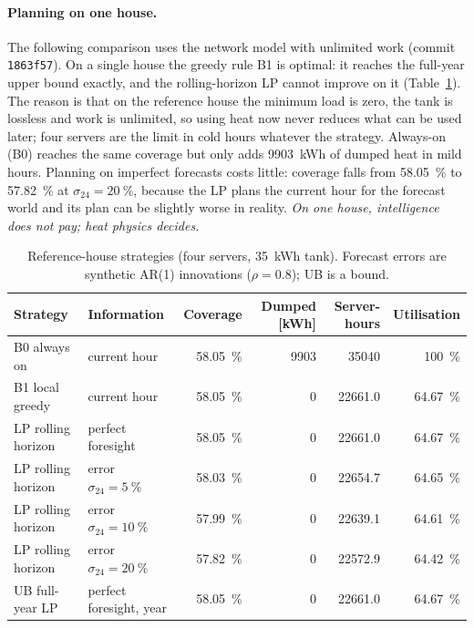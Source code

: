 \paragraph{Planning on one house.} The following comparison uses the network model with unlimited
work (commit \texttt{1863f57}). On a single house the greedy rule B1 is optimal: it reaches the full-year upper bound exactly, and
the rolling-horizon LP cannot improve on it (Table~\ref{tab:house-strategies}). The reason is that on
the reference house the minimum load is zero, the tank is lossless and work is unlimited, so using
heat now never reduces what can be used later; four servers are the limit in cold hours whatever the
strategy. Always-on (B0) reaches the same coverage but only adds \qty{9903}{kWh} of dumped heat in
mild hours. Planning on imperfect forecasts costs little: coverage falls from \qty{58.05}{\percent}
to \qty{57.82}{\percent} at $\sigma_{24} = \qty{20}{\percent}$, because the LP plans the current hour
for the forecast world and its plan can be slightly worse in reality.
\emph{On one house, intelligence does not pay; heat physics decides.}

\begin{table}[ht]
  \centering
  \caption{Reference-house strategies (four servers, \qty{35}{kWh} tank).
    Forecast errors are synthetic AR(1) innovations ($\rho=0.8$); UB is a bound.}
  \label{tab:house-strategies}
  \small
  \setlength{\tabcolsep}{4pt}
  \begin{tabular}{llrrrr}
    \toprule
    Strategy & Information & Coverage & Dumped [kWh] & Server-hours & Utilisation \\
    \midrule
    B0 always on & current hour & \qty{58.05}{\percent} & \num{9903} & \num{35040} & \qty{100}{\percent} \\
    B1 local greedy & current hour & \qty{58.05}{\percent} & 0 & \num{22661.0} & \qty{64.67}{\percent} \\
    LP rolling horizon & perfect foresight & \qty{58.05}{\percent} & 0 & \num{22661.0} & \qty{64.67}{\percent} \\
    LP rolling horizon & error $\sigma_{24} = \qty{5}{\percent}$ & \qty{58.03}{\percent} & 0 & \num{22654.7} & \qty{64.65}{\percent} \\
    LP rolling horizon & error $\sigma_{24} = \qty{10}{\percent}$ & \qty{57.99}{\percent} & 0 & \num{22639.1} & \qty{64.61}{\percent} \\
    LP rolling horizon & error $\sigma_{24} = \qty{20}{\percent}$ & \qty{57.82}{\percent} & 0 & \num{22572.9} & \qty{64.42}{\percent} \\
    UB full-year LP & perfect foresight, year & \qty{58.05}{\percent} & 0 & \num{22661.0} & \qty{64.67}{\percent} \\
    \bottomrule
  \end{tabular}
\end{table}

